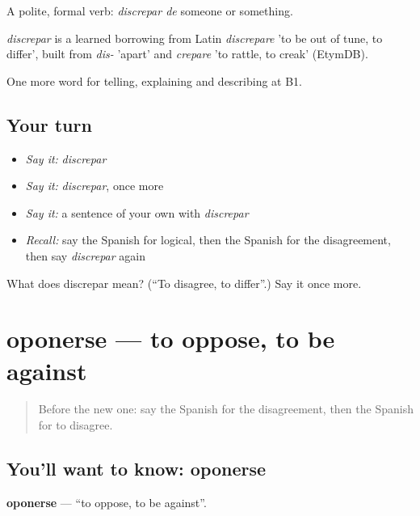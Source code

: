 A polite, formal verb: \emph{discrepar de} someone or something.

\begin{cousinweb}
\emph{discrepar} is a learned borrowing from Latin \emph{discrepare} 'to be out of tune, to differ', built from \emph{dis-} 'apart' and \emph{crepare} 'to rattle, to creak' (EtymDB).
\end{cousinweb}

\begin{grammarlens}[title={What you've built}]
One more word for telling, explaining and describing at B1.
\end{grammarlens}

\subsection*{Your turn}
\begin{itemize}
\raggedright
  \item \emph{Say it:} \emph{discrepar}
  \item \emph{Say it:} \emph{discrepar}, once more
  \item \emph{Say it:} a sentence of your own with \emph{discrepar}
  \item \emph{Recall:} say the Spanish for logical, then the Spanish for the disagreement, then say \emph{discrepar} again
\end{itemize}

\begin{tcolorbox}[breakable,colback=teal!4,colframe=teal!35!black,title={Before you move on}]
What does discrepar mean? (\textquotedblleft{}To disagree, to differ\textquotedblright{}.) Say it once more.
\end{tcolorbox}
\section[oponerse]{oponerse — to oppose, to be against}

\label{lesson:ES-C578-oponerse}



\begin{quote}
Before the new one: say the Spanish for the disagreement, then the Spanish for to disagree.
\end{quote}

\subsection*{You'll want to know: oponerse}
\textbf{oponerse} — \textquotedblleft{}to oppose, to be against\textquotedblright{}.

